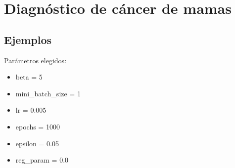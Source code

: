 \section{Diagnóstico de cáncer de mamas}

\subsection{Ejemplos}

Parámetros elegidos:

\begin{itemize}
\item beta = 5
\item mini\_batch\_size = 1
\item lr = 0.005
\item epochs = 1000
\item epsilon = 0.05
\item reg\_param = 0.0
\end{itemize}

